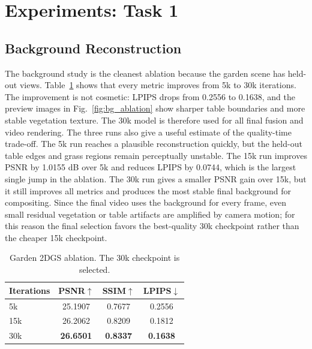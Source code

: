 \documentclass[10pt,twocolumn,letterpaper]{article}
\begin{document}
\section{Experiments: Task 1}

\subsection{Background Reconstruction}
The background study is the cleanest ablation because the garden scene has held-out views.
Table~\ref{tab:bg_ablation} shows that every metric improves from 5k to 30k iterations.
The improvement is not cosmetic: LPIPS drops from 0.2556 to 0.1638, and the preview images in Fig.~\ref{fig:bg_ablation} show sharper table boundaries and more stable vegetation texture.
The 30k model is therefore used for all final fusion and video rendering.
The three runs also give a useful estimate of the quality-time trade-off.
The 5k run reaches a plausible reconstruction quickly, but the held-out table edges and grass regions remain perceptually unstable.
The 15k run improves PSNR by 1.0155 dB over 5k and reduces LPIPS by 0.0744, which is the largest single jump in the ablation.
The 30k run gives a smaller PSNR gain over 15k, but it still improves all metrics and produces the most stable final background for compositing.
Since the final video uses the background for every frame, even small residual vegetation or table artifacts are amplified by camera motion; for this reason the final selection favors the best-quality 30k checkpoint rather than the cheaper 15k checkpoint.

\begin{table}[t]
\centering
\caption{Garden 2DGS ablation. The 30k checkpoint is selected.}
\label{tab:bg_ablation}
\begin{tabular}{lccc}
\toprule
Iterations & PSNR$\uparrow$ & SSIM$\uparrow$ & LPIPS$\downarrow$ \\
\midrule
5k  & 25.1907 & 0.7677 & 0.2556 \\
15k & 26.2062 & 0.8209 & 0.1812 \\
30k & \textbf{26.6501} & \textbf{0.8337} & \textbf{0.1638} \\
\bottomrule
\end{tabular}
\end{table}
\end{document}
